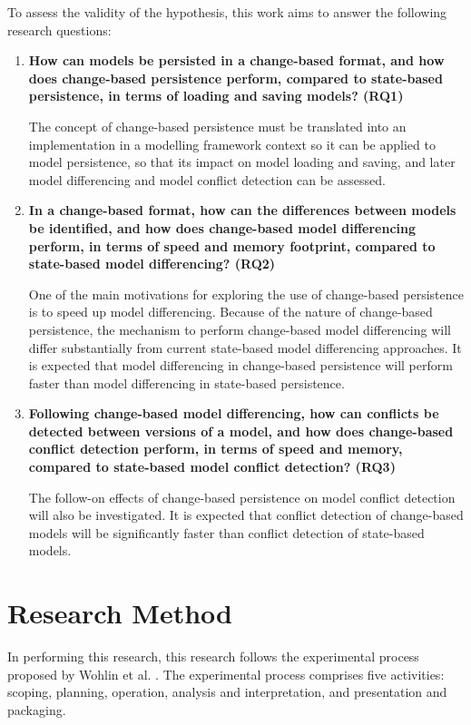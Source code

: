 To assess the validity of the hypothesis, this work aims to answer the following research questions:
\\
\begin{enumerate}
  \item \textbf{How can models be persisted in a change-based format, and how does change-based persistence perform, compared to state-based persistence, in terms of loading and saving models? (RQ1)}
  
  The concept of change-based persistence must be translated into an implementation in a modelling framework context so it can be applied to model persistence, so that its impact on model loading and saving, and later model differencing and model conflict detection can be assessed.
  
  \item \textbf{In a change-based format, how can the differences between models be identified, and how does change-based model differencing perform, in terms of speed and memory footprint, compared to state-based model differencing? (RQ2)}
  
  One of the main motivations for exploring the use of change-based persistence is to speed up model differencing. Because of the nature of change-based persistence, the mechanism to perform change-based model differencing will differ substantially from current state-based model differencing approaches. It is expected that model differencing in change-based persistence will perform faster than model differencing in state-based persistence.
  
  \item \textbf{Following change-based model differencing, how can conflicts be detected between versions of a model, and how does change-based conflict detection perform, in terms of speed and memory, compared to state-based model conflict detection? (RQ3)}
  
  The follow-on effects of change-based persistence on model conflict detection will also be investigated. It is expected that conflict detection of change-based models will be significantly faster than conflict detection of state-based models.
\end{enumerate}

\section{Research Method}
\label{sec:research_method}
In performing this research, this research follows the experimental process proposed by Wohlin et al. \cite{DBLP:books/daglib/0029933/Wohlin}. The experimental process comprises five activities: scoping, planning, operation, analysis and interpretation, and presentation and packaging.

